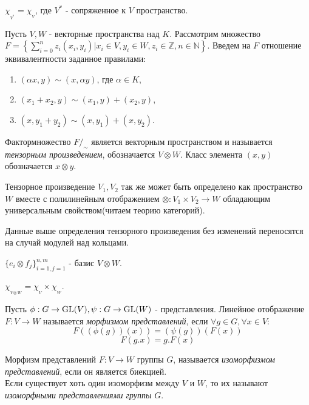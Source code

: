 \begin{ass}
$\chi_{_{V^*}} = \chi_{_V}$, где $V^*$ - сопряженное к $V$ пространство.
\end{ass}

\begin{defi}
Пусть $V,W$ - векторные пространства над $K$. Рассмотрим множество ${F=\left\{\sum\limits_{i=0}^nz_i(x_i,y_i)|x_i\in V,y_i\in W,z_i\in\mathbb{Z},n\in\mathbb{N}\right\}}$. Введем на $F$ отношение эквивалентности заданное правилами:
\begin{enumerate}
\item $(\alpha x,y)\sim(x,\alpha y)$, где $\alpha\in K$,
\item $(x_1+x_2,y)\sim (x_1,y)+(x_2,y)$,
\item $(x,y_1+y_2)\sim (x,y_1)+(x,y_2)$.
\end{enumerate}
Фактормножество $F/_\sim$ является векторным пространством и называется \textit{тензорным произведением}, обозначается $V\otimes W$. Класс элемента $(x,y)$ обозначается $x\otimes y$.
\end{defi}

\begin{remark}
Тензорное произведение $V_1,V_2$ так же может быть определено как пространство $W$ вместе с полилинейным отображением $\otimes:V_1\times V_2\to W$ обладающим универсальным свойством(читаем теорию категорий).
\end{remark}

\begin{remark}
Данные выше определения тензорного произведения без изменений переносятся на случай модулей над кольцами.
\end{remark}

\begin{ass}
$\{e_i\otimes f_j\}_{i=1,j=1}^{n,m}$ - базис $V\otimes W$.
\end{ass}

\begin{ass}
$\chi_{_{V\otimes W}} = \chi_{_V} \times \chi_{_W}$.
\end{ass}

\begin{defi}
Пусть $\phi:G\to\operatorname{GL}(V),\psi:G\to\operatorname{GL}(W)$ - представления. Линейное отображение $F:V\to W$ называется \textit{морфизмом представлений}, если $\forall g\in G,\forall x\in V$:
$$F((\phi(g))(x)) = (\psi(g))(F(x))$$
$$F(g.x) = g.F(x)$$
\end{defi}

\begin{defi}
Морфизм представлений $F:V\to W$ группы $G$, называется \textit{изоморфизмом представлений}, если он является биекцией.\\
Если существует хоть один изоморфизм между $V$ и $W$, то их называют\textit{ изоморфными представлениями группы} $G$.
\end{defi}

